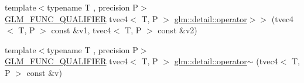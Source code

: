 \begin{DoxyCompactItemize}
\item 
{\footnotesize template$<$typename T , precision P$>$ }\\\hyperlink{setup_8hpp_a33fdea6f91c5f834105f7415e2a64407}{G\+L\+M\+\_\+\+F\+U\+N\+C\+\_\+\+Q\+U\+A\+L\+I\+F\+I\+ER} tvec4$<$ T, P $>$ \hyperlink{namespaceglm_1_1detail_a548702543b338e1de3e2c3be3b995c76}{glm\+::detail\+::operator$>$$>$} (tvec4$<$ T, P $>$ const \&v1, tvec4$<$ T, P $>$ const \&v2)
\item 
{\footnotesize template$<$typename T , precision P$>$ }\\\hyperlink{setup_8hpp_a33fdea6f91c5f834105f7415e2a64407}{G\+L\+M\+\_\+\+F\+U\+N\+C\+\_\+\+Q\+U\+A\+L\+I\+F\+I\+ER} tvec4$<$ T, P $>$ \hyperlink{namespaceglm_1_1detail_ab88f761c4ea52d73454a0e672f61f3c9}{glm\+::detail\+::operator$\sim$} (tvec4$<$ T, P $>$ const \&v)
\end{DoxyCompactItemize}
